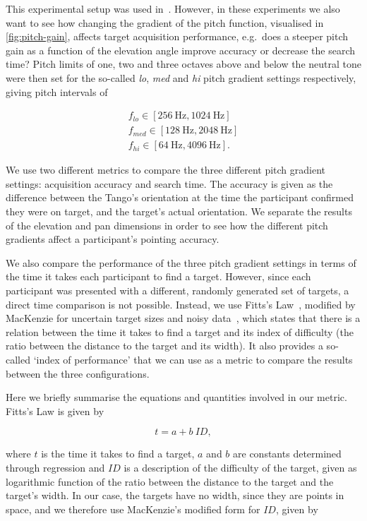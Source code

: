 \documentclass[acmsmall]{acmart}
\begin{document}
This experimental setup was used in~\cite{lock2019bone}.
However, in these experiments we also want to see how changing the gradient of the pitch function, visualised in \cref{fig:pitch-gain}, affects target acquisition performance, e.g.\ does a steeper pitch gain as a function of the elevation angle improve accuracy or decrease the search time?
Pitch limits of one, two and three octaves above and below the neutral tone were then set for the so-called \textit{lo}, \textit{med} and \textit{hi} pitch gradient settings respectively, giving pitch intervals of

\begin{gather*}
  f_{lo}\in[\SI{256}{\hertz}, \SI{1024}{\hertz}]\\
  f_{med}\in[\SI{128}{\hertz}, \SI{2048}{\hertz}]\\
  f_{hi}\in[\SI{64}{\hertz}, \SI{4096}{\hertz}].
\end{gather*}

We use two different metrics to compare the three different pitch gradient settings: acquisition accuracy and search time.
The accuracy is given as the difference between the Tango's orientation at the time the participant confirmed they were on target, and the target's actual orientation.
We separate the results of the elevation and pan dimensions in order to see how the different pitch gradients affect a participant's pointing accuracy. 

We also compare the performance of the three pitch gradient settings in terms of the time it takes each participant to find a target.
However, since each participant was presented with a different, randomly generated set of targets, a direct time comparison is not possible.
Instead, we use Fitts's Law~\citep{fitts1954information}, modified by MacKenzie for uncertain target sizes and noisy data~\citep{mackenzie1992fitts}, which states that there is a relation between the time it takes to find a target and its index of difficulty (the ratio between the distance to the target and its width).
It also provides a so-called `index of performance' that we can use as a metric to compare the results between the three configurations. 

Here we briefly summarise the equations and quantities involved in our metric.
Fitts's Law is given by  

\begin{equation}
  \label{eq:fitts-base}
  t = a + b~ID,
\end{equation}

\noindent
where $t$ is the time it takes to find a target, $a$ and $b$ are constants determined through regression and $ID$ is a description of the difficulty of the target, given as logarithmic function of the ratio between the distance to the target and the target's width.
In our case, the targets have no width, since they are points in space, and we therefore use MacKenzie's modified form for $ID$, given by
\end{document}
